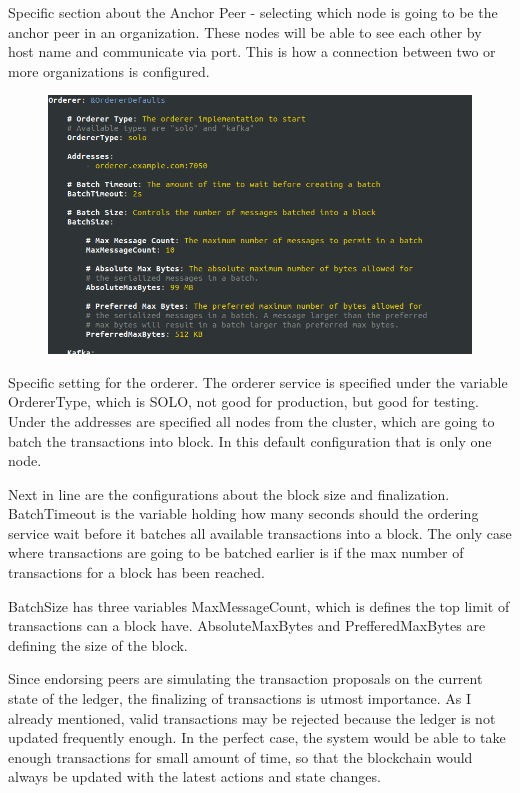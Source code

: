\documentclass[a4paper,11pt]{report}
\begin{document}
Specific section about the Anchor Peer - selecting which node is going to be the anchor peer in an organization. These nodes will be able to see each other by host name and communicate via port. This is how a connection between two or more organizations is configured. 

\begin{figure}[h]
\centering
  \includegraphics[width = 16cm]{configtx2.png}
  \caption{ }
  \label{configtx2}
\end{figure}

Specific setting for the orderer. The orderer service is specified under the variable OrdererType, which is SOLO, not good for production, but good for testing. Under the addresses are specified all nodes from the cluster, which are going to batch the transactions into block. In this default configuration that is only one node.
 
Next in line are the configurations about the block size and finalization. BatchTimeout is the variable holding how many seconds should the ordering service wait before it batches all available transactions into a block. The only case where transactions are going to be batched earlier is if the max number of transactions for a block has been reached.

	BatchSize has three variables MaxMessageCount, which is defines the top limit of transactions can a block have. AbsoluteMaxBytes and PrefferedMaxBytes are defining the size of the block.
	
	Since endorsing peers are simulating the transaction proposals on the current state of the ledger, the finalizing of transactions is utmost importance. As I already mentioned, valid transactions may be rejected because the ledger is not updated frequently enough. In the perfect case, the system would be able to take enough transactions for small amount of time, so that the blockchain would always be updated with the latest actions and state changes. 
	
\end{document}
